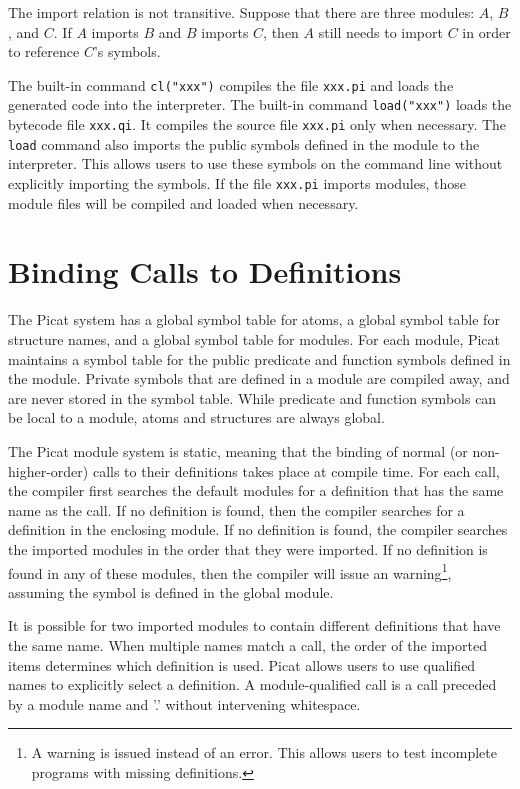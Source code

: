 The import relation is not transitive. Suppose that there are three modules: $A$, $B$, and $C$. If $A$ imports $B$ and $B$ imports $C$, then $A$ still needs to import $C$ in order to reference $C$'s symbols.

The built-in command \texttt{cl("xxx")} compiles the file \texttt{xxx.pi} and loads the generated code into the interpreter. The built-in command \texttt{load("xxx")} loads the bytecode file \texttt{xxx.qi}. It compiles the source file \texttt{xxx.pi} only when necessary. The \texttt{load} command  also imports the public symbols defined in the module to the interpreter.  This allows users to use these symbols on the command line without explicitly importing the symbols. If the file \texttt{xxx.pi} imports modules, those module files will be compiled and loaded when necessary. 

\section{Binding Calls to Definitions}
The Picat system has a global symbol table for atoms, a global symbol table for structure names, and a global symbol table for modules. For each module, Picat maintains a symbol table for the public predicate and function symbols defined in the module. Private symbols that are defined in a module are compiled away, and are never stored in the symbol table. While predicate and function symbols can be local to a module, atoms and structures are always global.

The Picat module system is static, meaning that the binding of normal (or non-higher-order) calls to their definitions takes place at compile time. For each call, the compiler first searches the default modules for a definition that has the same name as the call. If no definition is found, then the compiler searches for a definition in the enclosing module. If no definition is found, the compiler searches the imported modules in the order that they were imported. If no definition is found in any of these modules, then the compiler will issue an warning\footnote{A warning is issued instead of an error.  This allows users to test incomplete programs with missing definitions.}, assuming the symbol is defined in  the global module.

It is possible for two imported modules to contain different definitions that have the same name. When multiple names match a call, the order of the imported items determines which definition is used. Picat allows users to use qualified names to explicitly select a definition. A module-qualified call is a call preceded by a module name and '.' without intervening whitespace. 

